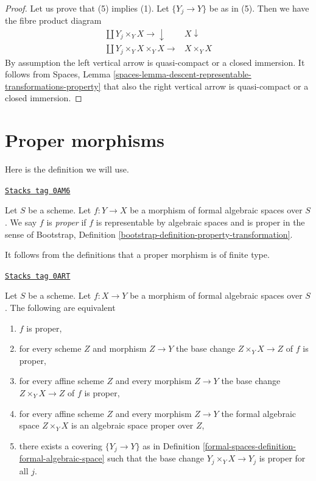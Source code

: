 \begin{proof}
\medskip\noindent
Let us prove that (5) implies (1). Let $\{Y_j \to Y\}$ be as in (5).
Then we have the fibre product diagram
$$
\begin{array}{cc}\coprod Y_j \times_Y X \longrightarrow\downarrow & X \downarrow \\ \coprod Y_j \times_Y X \times_Y X \longrightarrow & X \times_Y X\end{array}
$$
By assumption the left vertical arrow is quasi-compact or a closed immersion.
It follows from
Spaces, Lemma \ref{spaces-lemma-descent-representable-transformations-property}
that also the right vertical arrow is quasi-compact or a
closed immersion.
\end{proof}

\section{Proper morphisms}
\label{formal-spaces-section-proper}
Here is the definition we will use.

\begin{definition}[Proper]
\label{formal-spaces-definition-proper}
\href{https://stacks.math.columbia.edu/tag/0AM6}{\texttt{Stacks tag 0AM6}}

Let $S$ be a scheme. Let $f : Y \to X$ be a morphism of formal algebraic
spaces over $S$. We say $f$ is {\it proper}
if $f$ is representable by algebraic spaces and is proper in the sense of
Bootstrap, Definition \ref{bootstrap-definition-property-transformation}.
\end{definition}

It follows from the definitions that a proper morphism is of finite type.

\begin{lemma}
\label{formal-spaces-lemma-proper-local}
\href{https://stacks.math.columbia.edu/tag/0ART}{\texttt{Stacks tag 0ART}}

Let $S$ be a scheme. Let $f : X \to Y$ be a morphism of formal algebraic spaces
over $S$. The following are equivalent
\begin{enumerate}
\item $f$ is proper,
\item for every scheme $Z$ and morphism $Z \to Y$ the
base change $Z \times_Y X \to Z$ of $f$ is proper,
\item for every affine scheme $Z$ and every morphism $Z \to Y$ the
base change $Z \times_Y X \to Z$ of $f$ is proper,
\item for every affine scheme $Z$ and every morphism $Z \to Y$ the
formal algebraic space $Z \times_Y X$ is an algebraic space proper over $Z$,
\item there exists a covering $\{Y_j \to Y\}$ as in
Definition \ref{formal-spaces-definition-formal-algebraic-space}
such that the base change $Y_j \times_Y X \to Y_j$ is proper for all $j$.
\end{enumerate}
\end{lemma}

